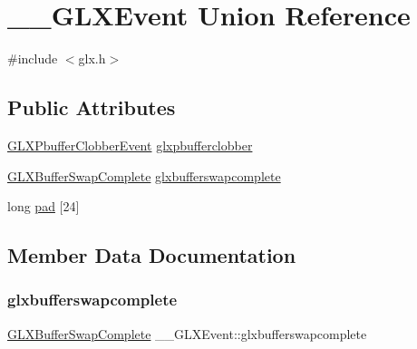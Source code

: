 \hypertarget{union_____g_l_x_event}{}\section{\+\_\+\+\_\+\+G\+L\+X\+Event Union Reference}
\label{union_____g_l_x_event}


{\ttfamily \#include $<$glx.\+h$>$}

\subsection*{Public Attributes}
\begin{DoxyCompactItemize}
\item 
\hyperlink{struct_g_l_x_pbuffer_clobber_event}{G\+L\+X\+Pbuffer\+Clobber\+Event} \hyperlink{union_____g_l_x_event_ada5880e2b424bcb2f60a411aaf713fae}{glxpbufferclobber}
\item 
\hyperlink{struct_g_l_x_buffer_swap_complete}{G\+L\+X\+Buffer\+Swap\+Complete} \hyperlink{union_____g_l_x_event_a6aea59c83ea2c10f86fdfb1573922606}{glxbufferswapcomplete}
\item 
long \hyperlink{union_____g_l_x_event_a1cb8f6e7e77a34d25baf43b3f3bc2d4f}{pad} \mbox{[}24\mbox{]}
\end{DoxyCompactItemize}


\subsection{Member Data Documentation}
\mbox{\label{union_____g_l_x_event_a6aea59c83ea2c10f86fdfb1573922606}} 
\subsubsection{\texorpdfstring{glxbufferswapcomplete}{glxbufferswapcomplete}}
{\footnotesize\ttfamily \hyperlink{struct_g_l_x_buffer_swap_complete}{G\+L\+X\+Buffer\+Swap\+Complete} \+\_\+\+\_\+\+G\+L\+X\+Event\+::glxbufferswapcomplete}

\mbox{\label{union_____g_l_x_event_ada5880e2b424bcb2f60a411aaf713fae}} 
